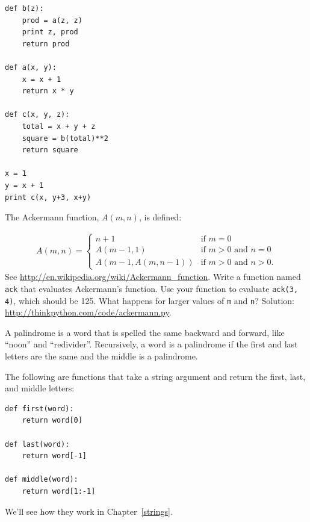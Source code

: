 \documentclass[10pt]{book}
\begin{document}
\begin{CJK}{UTF8}{gbsn}
\begin{exercise}
\begin{verbatim}
def b(z):
    prod = a(z, z)
    print z, prod
    return prod

def a(x, y):
    x = x + 1
    return x * y

def c(x, y, z):
    total = x + y + z
    square = b(total)**2
    return square

x = 1
y = x + 1
print c(x, y+3, x+y)
\end{verbatim}

\end{exercise}


\begin{exercise}
\label{ackermann}

The Ackermann function, $A(m, n)$, is defined:

\begin{eqnarray*}
A(m, n) = \begin{cases} 
              n+1 & \mbox{if } m = 0 \\ 
        A(m-1, 1) & \mbox{if } m > 0 \mbox{ and } n = 0 \\ 
A(m-1, A(m, n-1)) & \mbox{if } m > 0 \mbox{ and } n > 0.
\end{cases} 
\end{eqnarray*}
%
See \url{http://en.wikipedia.org/wiki/Ackermann_function}.
Write a function named {\tt ack} that evaluates Ackermann's function.
Use your function to evaluate {\tt ack(3, 4)}, which should be 125.
What happens for larger values of {\tt m} and {\tt n}?
Solution: \url{http://thinkpython.com/code/ackermann.py}.

\end{exercise}


\begin{exercise}
\label{palindrome}

A palindrome is a word that is spelled the same backward and
forward, like ``noon'' and ``redivider''.  Recursively, a word
is a palindrome if the first and last letters are the same
and the middle is a palindrome.

The following are functions that take a string argument and
return the first, last, and middle letters:

\begin{verbatim}
def first(word):
    return word[0]

def last(word):
    return word[-1]

def middle(word):
    return word[1:-1]
\end{verbatim}
%
We'll see how they work in Chapter~\ref{strings}.


\end{exercise}
\end{CJK}
\end{document}
